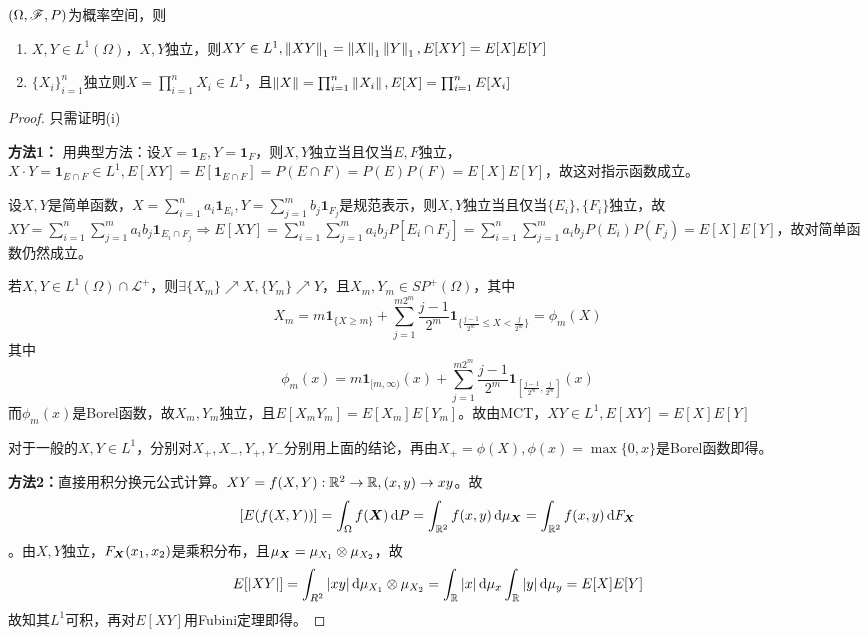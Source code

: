 \documentclass{ctexbook}
\begin{document}
\begin{Prop}
  $(\Omega,\mathscr{F}, P)$为概率空间，则
  \begin{enumerate}
  \item $X,Y\in L^{1}(\Omega)$，$X,Y$独立，则$XY\in L^{1}, \left\|XY\right\|_{1}=\left\|X\right\|_{1}\left\|Y\right\|_{1},E[XY]=E[X]E[Y]$
  \item $\{X_{i}\}_{i=1}^{n}$独立则$X=\prod_{i=1}^{n}X_{i}\in L^{1}$，且$\left\|X\right\|=\prod_{i=1}^{n}\left\|X_{i}\right\|, E[X]=\prod_{i=1}^{n}E[X_{i}]$
  \end{enumerate}
\end{Prop}
\begin{proof}
  只需证明(i)

  \textbf{方法1：} 用典型方法：设$X=\bm{1}_{E},Y=\bm{1}_{F}$，则$X,Y$独立当且仅当$E,F$独立，$X\cdot Y=\bm{1}_{E\cap F}\in L^{1},E[XY]=E[\bm{1}_{E\cap F}]=P(E\cap F)=P(E)P(F)=E[X]E[Y]$，故这对指示函数成立。

  设$X,Y$是简单函数，$X=\sum\limits_{i=1}^{n} a_{i}\bm{1}_{E_{i}}, Y=\sum\limits_{j=1}^{m} b_{j}\bm{1}_{F_{j}}$是规范表示，则$X,Y$独立当且仅当$\{E_{i}\},\{F_{i}\}$独立，故$XY=\sum\limits_{i=1}^{n}\sum\limits_{j=1}^{m} a_{i}b_{j}\bm{1}_{E_{i}\cap F_{j}}\Rightarrow E[XY]=\sum\limits_{i=1}^{n}\sum\limits_{j=1}^{m} a_{i}b_{j}P[E_{i}\cap F_{j}]=\sum\limits_{i=1}^{n}\sum\limits_{j=1}^{m} a_{i}b_{j}P(E_{i})P(F_{j})=E[X]E[Y]$，故对简单函数仍然成立。

  若$X,Y\in L^{1}(\Omega)\cap \mathcal{L}^{+}$，则$\exists \{X_{m}\}\nearrow X,\{Y_{m}\}\nearrow Y$，且$X_{m},Y_{m}\in SP^{+}(\Omega)$，其中
  \[X_{m}=m\bm{1}_{\{X\geq m\}}+\sum_{j=1}^{m2^{m}}\frac{j-1}{2^{m}}\bm{1}_{\{\frac{j-1}{2^{m}}\leq X<\frac{j}{2^{m}}\}}=\phi_{m}(X)\]
  其中
  \[\phi_{m}(x)=m\bm{1}_{[m,\infty)}(x)+\sum_{j=1}^{m2^{m}}\frac{j-1}{2^{m}}\bm{1}_{[\frac{j-1}{2^{m}},\frac{j}{2^{m}}]}(x)\]
  而$\phi_{m}(x)$是Borel函数，故$X_{m},Y_{m}$独立，且$E[X_{m}Y_{m}]=E[X_{m}]E[Y_{m}]$。故由MCT，$XY\in L^{1},E[XY]=E[X]E[Y]$

  对于一般的$X,Y\in L^{1}$，分别对$X_{+},X_{-},Y_{+},Y_{-}$分别用上面的结论，再由$X_{+}=\phi(X),\phi(x)=\max\{0,x\}$是Borel函数即得。

  \textbf{方法2：}直接用积分换元公式计算。$XY=f(X,Y):\mathbb{R}^{2}\to\mathbb{R}, (x,y)\to xy$。故
  \[[E(f(X,Y))]=\int_{\Omega}f(\bm{X})\,\mathrm{d} P=\int_{\mathbb{R}^{2}}f(x,y)\,\mathrm{d}\mu_{\bm{X}}=\int_{\mathbb{R}^{2}}f(x,y)\,\mathrm{d} F_{\bm{X}}\]
  。由$X,Y$独立，$F_{\bm{X}}(x_{1},x_{2})$是乘积分布，且$\mu_{\bm{X}}=\mu_{X_{1}}\otimes \mu_{X_{2}}$，故
  \[E[|XY|]=\int_{R^{2}}|xy|\,\mathrm{d}\mu_{X_{1}}\otimes \mu_{X_{2}}=\int_{\mathbb{R}}|x|\,\mathrm{d}\mu_{x}\int_{\mathbb{R}}|y|\,\mathrm{d} \mu_{y}=E[X]E[Y]\]
  故知其$L^{1}$可积，再对$E[XY]$用Fubini定理即得。
\end{proof}
\end{document}

